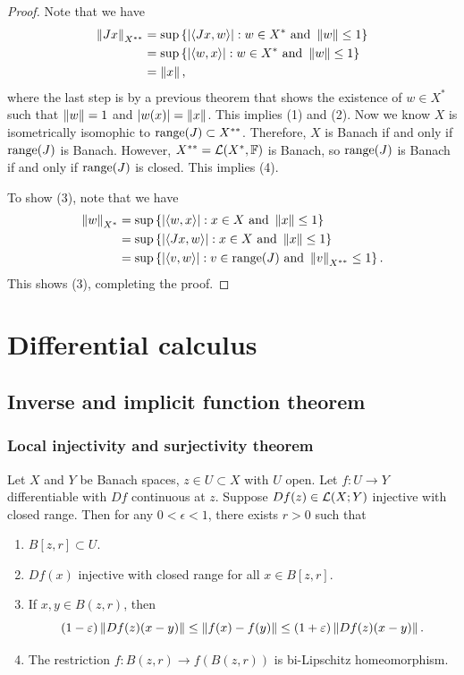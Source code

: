 \documentclass[a4paper]{article}
\begin{document}
\begin{proof}
Note that we have
\[
\begin{aligned}
\left\lVert Jx\right\rVert_{X^{**}}
&= \sup \left\{ \left\lvert \left\langle Jx, w \right\rangle\right\rvert: w \in X^* \text{ and } \left\lVert w\right\rVert \leq 1 \right\} \\
&= \sup \left\{ \left\lvert \left\langle w, x \right\rangle\right\rvert: w \in X^* \text{ and } \left\lVert w\right\rVert \leq 1 \right\} \\
&= \left\lVert x\right\rVert,
\end{aligned}
\]
where the last step is by a previous theorem that shows
the existence of $w \in X^*$ such that $\left\lVert w\right\rVert = 1$ and
$\left\lvert w(x)\right\rvert = \left\lVert x\right\rVert$. This implies (1) and (2).
Now we know $X$ is isometrically isomophic to $\operatorname{range}(J) \subset
X^{**}$. Therefore, $X$ is Banach if and only if $\operatorname{range}(J)$ is
Banach. However, $X^{**} = \mathcal{L}(X^*, \mathbb{F})$ is Banach, so
$\operatorname{range}(J)$ is Banach if and only if $\operatorname{range}(J)$ is closed.
This implies (4).

To show (3), note that we have
\[
\begin{aligned}
\left\lVert w\right\rVert_{X^*}
&= \sup \left\{ \left\lvert \left\langle w, x \right\rangle\right\rvert : x \in X \text{ and } \left\lVert x\right\rVert \leq 1 \right\} \\
&= \sup \left\{ \left\lvert \left\langle Jx, w \right\rangle\right\rvert : x \in X \text{ and } \left\lVert x\right\rVert \leq 1 \right\} \\
&= \sup \left\{ \left\lvert \left\langle v, w \right\rangle\right\rvert : v \in \operatorname{range}(J) \text{ and } \left\lVert v\right\rVert_{X^{**}} \leq 1 \right\}.
\end{aligned}
\]
This shows (3), completing the proof.
\end{proof}

\section{Differential calculus}

\subsection{Inverse and implicit function theorem}

\subsubsection{Local injectivity and surjectivity 
theorem}

\begin{thm}
Let $X$ and $Y$ be Banach spaces, $z \in U \subset X$
with $U$ open. Let $f: U \to Y$ differentiable with
$Df$ continuous at $z$. Suppose $Df(z) \in \mathcal{L}(X; Y)$
injective with closed range. Then for any $0 < \epsilon < 1$,
there exists $r > 0$ such that
\begin{enumerate}
  \item $B[z, r] \subset U$.
  \item $Df(x)$ injective with closed range for all $x \in
  B[z, r]$.
  \item If $x, y \in B(z, r)$, then
  \[
  (1 - \varepsilon) \left\lVert Df(z) (x - y)\right\rVert
  \leq \left\lVert f(x) - f(y)\right\rVert
  \leq (1 + \varepsilon) \left\lVert Df(z) (x - y)\right\rVert.
  \]
  \item The restriction $f: B(z, r) \to f(B(z, r))$
  is bi-Lipschitz homeomorphism.
\end{enumerate}
\end{thm}
\end{document}

